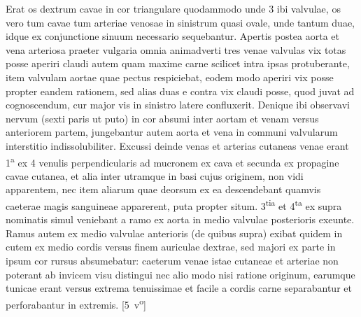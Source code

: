 \pend%
\pstart%
Erat os dextrum cavae in cor triangulare quodammodo unde 3 ibi valvulae, os vero tum cavae tum arteriae venosae in sinistrum quasi ovale, unde tantum duae, idque ex conjunctione sinuum necessario sequebantur.
\pend%
\pstart%
Apertis postea aorta et vena arteriosa praeter vulgaria omnia animadverti tres venae valvulas vix totas posse aperiri claudi autem quam maxime carne scilicet intra ipsas protuberante, item valvulam aortae quae pectus respiciebat, eodem modo aperiri vix posse propter eandem rationem, sed alias duas e contra vix claudi posse, quod juvat ad cognoscendum, cur major vis in sinistro latere confluxerit. Denique ibi observavi nervum (sexti paris ut puto) in cor absumi inter aortam et venam versus anteriorem partem, jungebantur autem aorta et vena in communi valvularum interstitio indissolubiliter. Excussi deinde venas et arterias cutaneas venae erant 1\textsuperscript{a} ex 4 venulis perpendicularis ad mucronem ex cava et secunda ex propagine cavae cutanea, et alia inter utramque in basi cujus originem, non vidi apparentem, nec item aliarum quae deorsum ex ea descendebant quamvis caeterae magis sanguineae apparerent, puta propter situm. 3\textsuperscript{tia} et 4\textsuperscript{ta} ex supra nominatis simul veniebant a ramo ex aorta in medio valvulae posterioris exeunte. Ramus autem ex medio valvulae anterioris (de quibus supra) exibat quidem in cutem ex medio cordis versus finem auriculae dextrae, sed majori ex parte in ipsum cor rursus absumebatur: caeterum venae istae cutaneae et arteriae non poterant ab invicem visu distingui nec alio modo nisi ratione originum, earumque tunicae erant versus extrema tenuissimae et facile a cordis carne separabantur et perforabantur in extremis.
[5~v\textsuperscript{o}]
\pend
